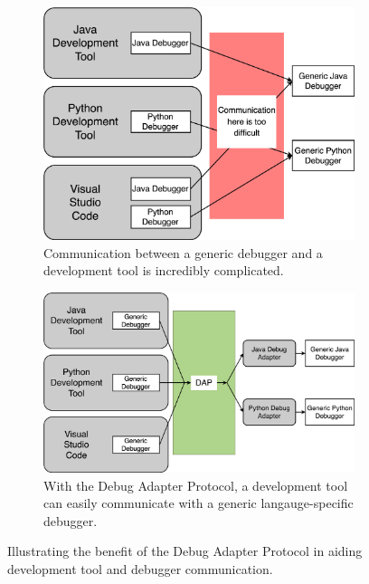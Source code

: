 \documentclass{article}
\begin{document}
\begin{figure}[h]
    \begin{subfigure}[c][][c]{0.45\textwidth}
        \includegraphics[width=\textwidth]{png/no-dap-theory.png}
        \caption{
            \centering
                Communication between a generic debugger and a development tool is incredibly complicated.
        }
        \label{fig:no-dap-theory}
    \end{subfigure}
    \hspace{0.05\textwidth}
    \begin{subfigure}[c][][c]{0.45\textwidth}
        \includegraphics[width=\textwidth]{png/dap-theory.png}
        \caption{
            \centering
                With the Debug Adapter Protocol, a development tool can easily communicate with a generic langauge-specific debugger.
        }
        \label{fig:dap-theory}
    \end{subfigure}
    \caption{
        \centering
            Illustrating the benefit of the Debug Adapter Protocol in aiding development tool and debugger communication.
    }
    \label{fig:dap}
\end{figure}
\end{document}
